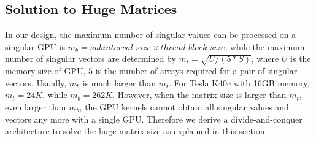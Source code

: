 
\vspace{-0.1in}
\subsection{Solution to Huge Matrices} \label{sec_huge}
\vspace{-0.1in}
In our design, the maximum number of singular values can be processed on a singular GPU is $m_b = subinterval\_size \times thread\_block\_size$,
while the maximum number of singular vectors are determined by $m_t = \sqrt{U / (5 * S)}$,
where $U$ is the memory size of GPU, $5$ is the number of arrays required for a pair of singular vectors.
Usually, $m_b$ is much larger than $m_t$.
For Tesla K40c with 16GB memory, $m_t = 24K$, while $m_b = 262K$.
However, when the matrix size is larger than $m_t$, even larger than $m_b$,
the GPU kernels cannot obtain all singular values and vectors any more with a single GPU.
Therefore we derive a divide-and-conquer architecture to solve the huge matrix size as explained in this section.

